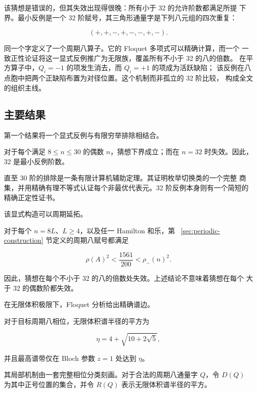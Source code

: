 该猜想是错误的，但其失效出现得很晚：所有小于 32 的允许阶数都满足所提
下界。最小反例是一个 32 阶赋号，其三角形通量字是下列八元组的四次重复：

\begin{equation}
(+,+,-,+,-,-,+,-).
\end{equation}

同一个字定义了一个周期八算子。它的 Floquet 多项式可以精确计算，而一个
一致正性论证将这一显式反例推广为无限族，覆盖所有不小于 32 的八的倍数。
在平方算子中，\(Q_i=-1\) 的项发生消去，而 \(Q_i=+1\) 的项成为活跃缺陷；
该反例在八点胞中把两个正缺陷布置为对径位置。这个机制而非孤立的 32 阶比较，
构成全文的组织主线。

\subsection{主要结果}

第一个结果将一个显式反例与有限穷举排除相结合。

\begin{theorem}[最小反例定理]
\label{thm:smallest-counterexample}
对于每个满足 \(8\leq n\leq 30\) 的偶数 \(n\)，猜想下界成立；而在
\(n=32\) 时失效。因此，32 是最小反例阶数。

\end{theorem}
直至 30 阶的排除是一条有限计算机辅助定理。其证明枚举切换类的一个完整
商集，并用精确有理不等式认证每个非最优代表元。32 阶反例本身则有一个简短的
精确正定性证书。

该显式构造可以周期延拓。

\begin{theorem}[无限反例族定理]
\label{thm:infinite-counterexample-family}
对于每个 \(n=8L\)、\(L\geq 4\)，以及任一 Hamilton 和乐，第~
\ref{sec:periodic-construction} 节定义的周期八赋号都满足

\begin{equation}
\rho(A)^{2} < \frac{1561}{200} < \rho_-(n)^{2}.
\end{equation}

因此，猜想在每个不小于 32 的八的倍数处失效。上述结论不意味着猜想在每个
大于 32 的偶数阶都失效。

\end{theorem}
在无限体积极限下，Floquet 分析给出精确谱边。

\begin{theorem}[周期八精确谱边定理]
\label{thm:exact-period-eight-edge}
对于目标周期八相位，无限体积谱半径的平方为

\begin{equation}
\eta=4+\sqrt{10+2\sqrt{5}},
\end{equation}

并且最高谱带仅在 Bloch 参数 \(z=1\) 处达到 \(\eta\)。

\end{theorem}
其局部机制由一套完整相位分类刻画。对于合法的周期八通量字 \(Q\)，令
\(D(Q)\) 为其中正号位置的集合，并令 \(R(Q)\) 表示无限体积谱半径的平方。

